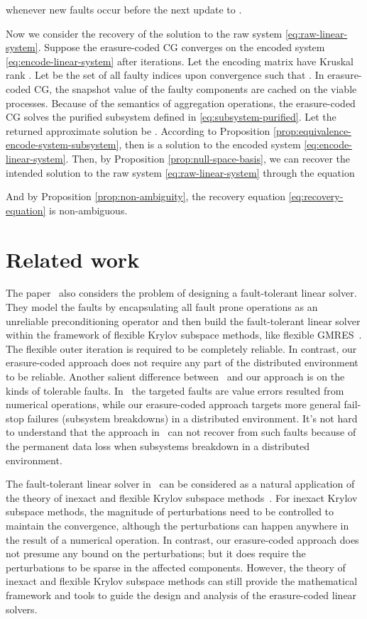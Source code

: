 \documentclass[11pt]{article}
\begin{document}
whenever new faults occur before the next update to .


Now we consider the recovery of the solution to the raw system \eqref{eq:raw-linear-system}.
Suppose the erasure-coded CG converges on the encoded system \eqref{eq:encode-linear-system}
after  iterations. Let the encoding matrix  have
Kruskal rank . Let  be the set of all faulty indices upon convergence
such that . In erasure-coded CG, the snapshot value  of the faulty
components  are cached on the viable processes. Because of the semantics of
aggregation operations, the erasure-coded CG solves the purified subsystem defined
in \eqref{eq:subsystem-purified}. Let the returned approximate solution be
. According to Proposition \ref{prop:equivalence-encode-system-subsystem},
then  is a solution to the encoded system
\eqref{eq:encode-linear-system}. Then, by Proposition \ref{prop:null-space-basis}, we can
recover the intended solution to the raw system \eqref{eq:raw-linear-system} through the
equation

And by Proposition \ref{prop:non-ambiguity}, the recovery equation \eqref{eq:recovery-equation} is non-ambiguous.

\section{Related work}

The paper~\cite{BridgesFHH:2012} also considers the problem of designing a fault-tolerant
linear solver. They model the faults by encapsulating all fault prone operations as an
unreliable preconditioning operator and then build the fault-tolerant linear solver within
the framework of flexible Krylov subspace methods, like flexible GMRES~\cite{Saad:1993}.
The flexible outer iteration is required to be completely reliable. In contrast,
our erasure-coded approach does not require any part of the distributed environment
to be reliable. Another salient difference between~\cite{BridgesFHH:2012} and our
approach is on the kinds of tolerable faults. In~\cite{BridgesFHH:2012} the targeted
faults are value errors resulted from numerical operations, while our erasure-coded
approach targets more general fail-stop failures (subsystem breakdowns) in a distributed
environment. It's not hard to understand that the approach in~\cite{BridgesFHH:2012}
can not recover from such faults because of the permanent data loss when subsystems
breakdown in a distributed environment.
\par
The fault-tolerant linear solver in~\cite{BridgesFHH:2012} can be considered as a
natural application of the theory of inexact and flexible Krylov subspace
methods~\cite{EshofS:2004,SimonciniS:2003a,SimonciniS:2003b}. For inexact Krylov
subspace methods, the magnitude of perturbations need to be controlled to
maintain the convergence, although the perturbations can happen anywhere in the
result of a numerical operation. In contrast, our erasure-coded approach does not
presume any bound on the perturbations; but it does require the perturbations to
be sparse in the affected components. However, the theory of inexact and flexible
Krylov subspace methods can still provide the mathematical framework and tools to
guide the design and analysis of the erasure-coded linear solvers.
\end{document}
